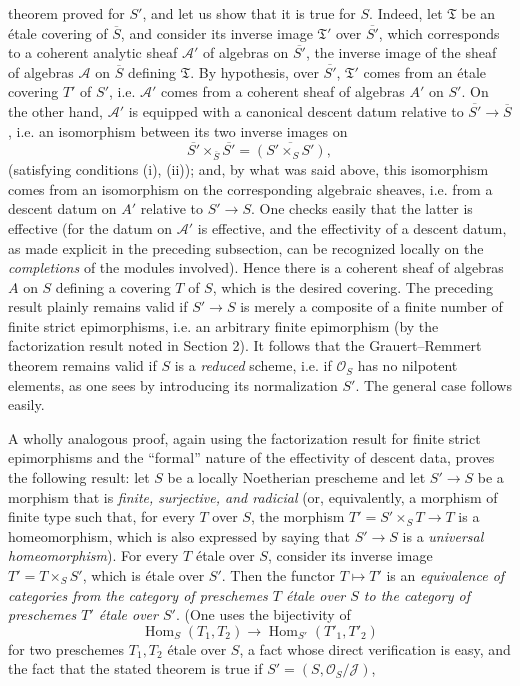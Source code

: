 theorem proved for $S'$, and let us show that it is true for $S$. Indeed, let
$\mathfrak T$ be an étale covering of $\overline S$, and consider its inverse
image $\mathfrak T'$ over $\overline{S'}$, which corresponds to a coherent
analytic sheaf $\mathcal A'$ of algebras on $\overline{S'}$, the inverse image
of the sheaf of algebras $\mathcal A$ on $\overline S$ defining
$\mathfrak T$. By hypothesis, over $\overline{S'}$, $\mathfrak T'$ comes from
an étale covering $T'$ of $S'$, i.e. $\mathcal A'$ comes from a coherent sheaf
of algebras $A'$ on $S'$. On the other hand, $\mathcal A'$ is equipped with a
canonical descent datum relative to
$\overline{S'}\longrightarrow\overline S$, i.e. an isomorphism between its two
inverse images on
\[
  \overline{S'}\times_{\overline S}\overline{S'}
  =\overline{(S'\times_SS')},
\]
(satisfying conditions (i), (ii)); and, by what was said above, this
isomorphism comes from an isomorphism on the corresponding algebraic sheaves,
i.e. from a descent datum on $A'$ relative to $S'\longrightarrow S$. One checks
easily that the latter is effective (for the datum on $\mathcal A'$ is
effective, and the effectivity of a descent datum, as made explicit in the
preceding subsection, can be recognized locally on the \emph{completions} of
the modules involved). Hence there is a coherent sheaf of algebras $A$ on $S$
defining a covering $T$ of $S$, which is the desired covering. The preceding
result plainly remains valid if $S'\longrightarrow S$ is merely a composite of
a finite number of finite strict epimorphisms, i.e. an arbitrary finite
epimorphism (by the factorization result noted in Section 2). It follows that
the Grauert--Remmert theorem remains valid if $S$ is a \emph{reduced} scheme,
i.e. if $\mathcal O_S$ has no nilpotent elements, as one sees by introducing
its normalization $S'$. The general case follows easily.

A wholly analogous proof, again using the factorization result for finite
strict epimorphisms and the “formal” nature of the effectivity of descent data,
proves the following result: let $S$ be a locally Noetherian prescheme and let
$S'\longrightarrow S$ be a morphism that is \emph{finite, surjective, and
radicial} (or, equivalently, a morphism of finite type such that, for every $T$
over $S$, the morphism $T'=S'\times_ST\longrightarrow T$ is a homeomorphism,
which is also expressed by saying that $S'\longrightarrow S$ is a
\emph{universal homeomorphism}). For every $T$ étale over $S$, consider its
inverse image $T'=T\times_SS'$, which is étale over $S'$. Then the functor
$T\longmapsto T'$ is an \emph{equivalence of categories from the category of
preschemes $T$ étale over $S$ to the category of preschemes $T'$ étale over
$S'$}. (One uses the bijectivity of
\[
  \operatorname{Hom}_S(T_1,T_2)\longrightarrow
  \operatorname{Hom}_{S'}(T'_1,T'_2)
\]
for two preschemes $T_1,T_2$ étale over $S$, a fact whose direct verification
is easy, and the fact that the stated theorem is true if
$S'=(S,\mathcal O_S/\mathcal J)$,


